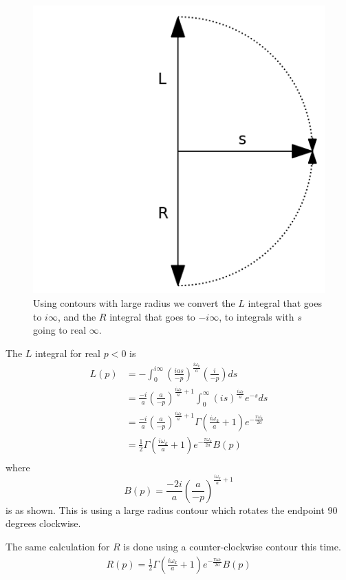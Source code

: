 \documentclass[12pt,a4paper]{article}
\begin{document}
\begin{figure}[h]
\centering
\includegraphics[scale=0.6]{contour.png}
\caption{Using contours with large radius we convert the $L$ integral that goes to $i\infty$, and the $R$ integral that goes to $-i\infty$, to integrals with $s$ going to real $\infty$.}
\label{fig:x cubed graph}
\end{figure}


The $L$ integral for real $p<0$ is
\[
\begin{split}
  L(p) & = -\int_0^{i\infty} \left(\frac{ias}{-p}\right)^\frac{i\omega_k}{a} \left(\frac{i}{-p}\right)ds \\
  & = \frac{-i}{a} \left(\frac{a}{-p}\right)^{\frac{i\omega_k}{a} + 1} \int_0^\infty \left(is\right) ^ \frac{i\omega_k}{a} e^{-s} ds \\
  & = \frac{-i}{a} \left(\frac{a}{-p}\right)^{\frac{i\omega_k}{a} + 1} \Gamma\left(\frac{i\omega_k}{a} + 1\right) e^{-\frac{\pi \omega_k}{2a}} \\
  & = \frac{1}{2} \Gamma\left(\frac{i\omega_k}{a} + 1\right) e^{-\frac{\pi \omega_k}{2a}} B(p)\\
\end{split}
\]
where
\[
B(p) = \frac{-2i}{a} \left(\frac{a}{-p}\right)^{\frac{i\omega_k}{a} + 1} 
\]
is as shown.  This is using a large radius contour which rotates the endpoint 90 degrees clockwise.

The same calculation for $R$ is done using a counter-clockwise contour this time.
\[
\begin{split}
  R(p) = \frac{1}{2}\Gamma\left(\frac{i\omega_k}{a} + 1\right) e^{-\frac{\pi \omega_k}{2a}} B(p)
\end{split}
\]
\end{document}
